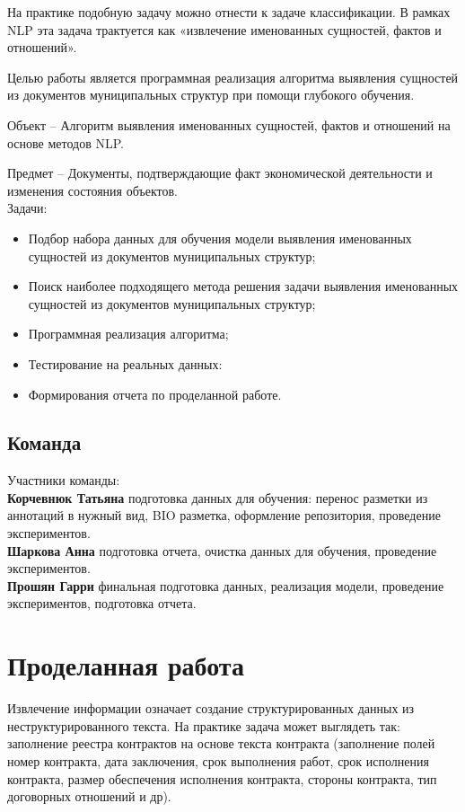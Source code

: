 \documentclass{article}
\begin{document}
На практике подобную задачу можно отнести к задаче классификации. В рамках NLP эта задача трактуется как «извлечение именованных сущностей, фактов и отношений». 

Целью работы является программная реализация алгоритма выявления сущностей из документов муниципальных структур при помощи глубокого обучения. 

Объект – Алгоритм выявления именованных сущностей, фактов и отношений на основе методов NLP. 

Предмет – Документы, подтверждающие факт экономической деятельности и изменения состояния объектов. \\
Задачи: 
\begin{itemize}
    \item Подбор набора данных для обучения модели выявления именованных сущностей из документов муниципальных структур;
    \item Поиск наиболее подходящего метода решения задачи выявления именованных сущностей из документов муниципальных структур;
    \item Программная реализация алгоритма;
    \item Тестирование на реальных данных:
    \item Формирования отчета по проделанной работе.
\end{itemize}

\subsection{Команда}
Участники команды: \\ 

\textbf{Корчевнюк Татьяна} подготовка данных для обучения: перенос разметки из аннотаций в нужный вид, BIO разметка, оформление репозитория, проведение экспериментов.\\ 

\textbf{Шаркова Анна} подготовка отчета, очистка данных для обучения, проведение экспериментов. \\ 

\textbf{Прошян Гарри} финальная подготовка данных, реализация модели, проведение экспериментов, подготовка отчета. \\ 




\section{Проделанная работа}
Извлечение информации означает создание структурированных данных из неструктурированного текста. На практике задача может выглядеть так: заполнение реестра контрактов на основе текста контракта (заполнение полей номер контракта, дата заключения, срок выполнения работ, срок исполнения контракта, размер обеспечения исполнения контракта, стороны контракта, тип договорных отношений и др).
\end{document}
